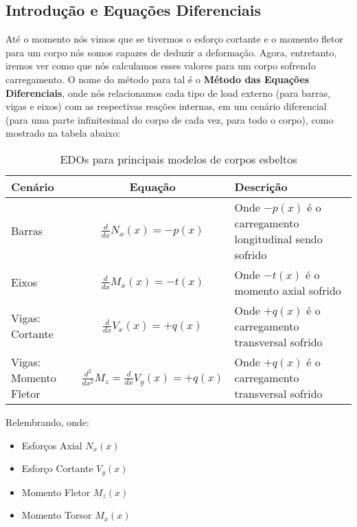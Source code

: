 \documentclass{article}
\begin{document}
            \subsection{Introdução e Equações Diferenciais}
                Até o momento nós vimos que se tivermos o esforço cortante e o momento fletor para um corpo nós somos capazes de deduzir a deformação. Agora, entretanto, iremos ver como que nós calculamos
                esses valores para um corpo sofrendo carregamento. O nome do método para tal é o \textbf{Método das Equações Diferenciais}, onde nós relacionamos cada tipo de load externo (para barras,
                vigas e eixos) com as respectivas reações internas, em um cenário diferencial (para uma parte infinitesimal do corpo de cada vez, para todo o corpo), como mostrado na tabela abaixo:

                \begin{table}[h]
                    \centering
                    \begin{tabular}{|l|c|l|}\hline
                        \textbf{Cenário} & \textbf{Equação} & \textbf{Descrição}\\ \hline
                        \rule{0pt}{4ex} Barras & $\frac{d}{dx}N_x(x) = -p(x)$ & Onde $-p(x)$ é o carregamento longitudinal sendo sofrido \\[2ex]  \hline
                        \rule{0pt}{4ex} Eixos  & $\frac{d}{dx}M_x(x) = -t(x)$ & Onde $-t(x)$ é o momento axial sofrido \\[2ex]\hline
                        \rule{0pt}{4ex} Vigas: Cortante & $\frac{d}{dx}V_x(x) = +q(x)$ & Onde $+q(x)$ é o carregamento transversal sofrido \\[2ex] \hline
                        \rule{0pt}{4ex} Vigas: Momento Fletor & $\frac{d^2}{dx^2}M_z = \frac{d}{dx}V_y(x) = +q(x)$ & Onde $+q(x)$ é o carregamento transversal sofrido \\[2ex] \hline
                        
                    \end{tabular}
                    \caption{EDOs para principais modelos de corpos esbeltos}
                    \label{tb:edo_esf_internos}
                \end{table}

                Relembrando, onde:
                \begin{itemize}
                    \item Esforços Axial $N_x(x)$
                    \item Esforço Cortante $V_y(x)$
                    \item Momento Fletor $M_z(x)$
                    \item Momento Torsor $M_x(x)$
                \end{itemize}
\end{document}
